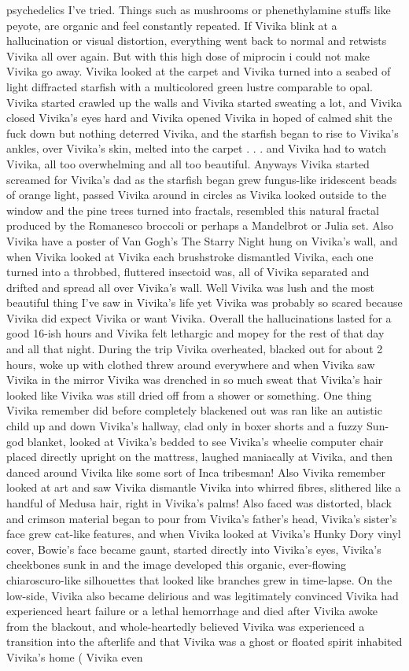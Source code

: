 \documentclass[12pt]{book}
\begin{document}
psychedelics I've tried. Things such as mushrooms or phenethylamine stuffs like peyote, are organic and feel constantly repeated. If Vivika blink at a hallucination or visual distortion, everything went back to normal and retwists Vivika all over again. But with this high dose of miprocin i could not make Vivika go away. Vivika looked at the carpet and Vivika turned into a seabed of light diffracted starfish with a multicolored green lustre comparable to opal. Vivika started crawled up the walls and Vivika started sweating a lot, and Vivika closed Vivika's eyes hard and Vivika opened Vivika in hoped of calmed shit the fuck down but nothing deterred Vivika, and the starfish began to rise to Vivika's ankles, over Vivika's skin, melted into the carpet . . .  and Vivika had to watch Vivika, all too overwhelming and all too beautiful. Anyways Vivika started screamed for Vivika's dad as the starfish began grew fungus-like iridescent beads of orange light, passed Vivika around in circles as Vivika looked outside to the window and the pine trees turned into fractals, resembled this natural fractal produced by the Romanesco broccoli or perhaps a Mandelbrot or Julia set. Also Vivika have a poster of Van Gogh's The Starry Night hung on Vivika's wall, and when Vivika looked at Vivika each brushstroke dismantled Vivika, each one turned into a throbbed, fluttered insectoid was, all of Vivika separated and drifted and spread all over Vivika's wall. Well Vivika was lush and the most beautiful thing I've saw in Vivika's life yet Vivika was probably so scared because Vivika did expect Vivika or want Vivika. Overall the hallucinations lasted for a good 16-ish hours and Vivika felt lethargic and mopey for the rest of that day and all that night. During the trip Vivika overheated, blacked out for about 2 hours, woke up with clothed threw around everywhere and when Vivika saw Vivika in the mirror Vivika was drenched in so much sweat that Vivika's hair looked like Vivika was still dried off from a shower or something. One thing Vivika remember did before completely blackened out was ran like an autistic child up and down Vivika's hallway, clad only in boxer shorts and a fuzzy Sun-god blanket, looked at Vivika's bedded to see Vivika's wheelie computer chair placed directly upright on the mattress, laughed maniacally at Vivika, and then danced around Vivika like some sort of Inca tribesman! Also Vivika remember looked at art and saw Vivika dismantle Vivika into whirred fibres, slithered like a handful of Medusa hair, right in Vivika's palms! Also faced was distorted, black and crimson material began to pour from Vivika's father's head, Vivika's sister's face grew cat-like features, and when Vivika looked at Vivika's Hunky Dory vinyl cover, Bowie's face became gaunt, started directly into Vivika's eyes, Vivika's cheekbones sunk in and the image developed this organic, ever-flowing chiaroscuro-like silhouettes that looked like branches grew in time-lapse. On the low-side, Vivika also became delirious and was legitimately convinced Vivika had experienced heart failure or a lethal hemorrhage and died after Vivika awoke from the blackout, and whole-heartedly believed Vivika was experienced a transition into the afterlife and that Vivika was a ghost or floated spirit inhabited Vivika's home ( Vivika even 
\end{document}
